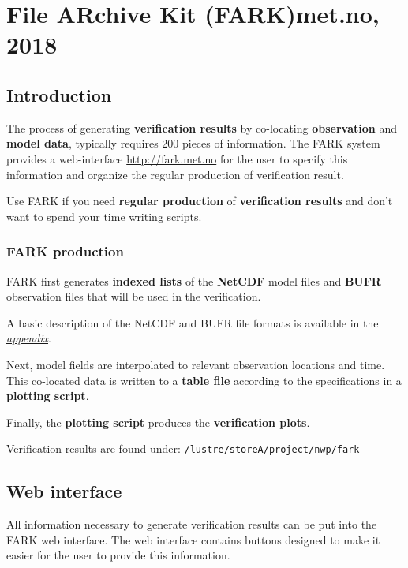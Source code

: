 \documentclass[letterpaper,10pt,twoside,twocolumn,openany]{book}
\begin{document}

\chapter{File ARchive Kit (FARK)\tiny{met.no, 2018}}

\section{Introduction}
The process of generating {\bf verification results} by co-locating {\bf observation} and {\bf model data}, 
typically requires 200 pieces of information.
The FARK system provides a web-interface \url{http://fark.met.no} for the user to specify this information and
organize the regular production of verification result.

\begin{quotebox}
   Use FARK if you need {\bf regular production} of {\bf verification results} 
   and don't want to spend your time writing scripts.
\end{quotebox}

\subsection{FARK production}

FARK first generates {\bf indexed lists} of the {\bf NetCDF} model files 
and {\bf BUFR} observation files that will be used in the verification.

A basic description of the NetCDF and BUFR file formats is available in the \hyperlink{appendix}{{\em appendix}}.

Next, model fields are interpolated to relevant observation locations and time.
This co-located data is written to a {\bf table file} according to the specifications in a {\bf plotting script}.

Finally, the {\bf plotting script} produces the {\bf verification plots}.

\begin{quotebox}
Verification results are found under:
\href{/lustre/storeA/project/nwp/fark/.}{\lstinline!/lustre/storeA/project/nwp/fark!}
\end{quotebox}

\section{Web interface}
All information necessary to generate verification results can
be put into the FARK web interface.
The web interface contains buttons designed to make it easier for the
user to provide this information.
\end{document}
